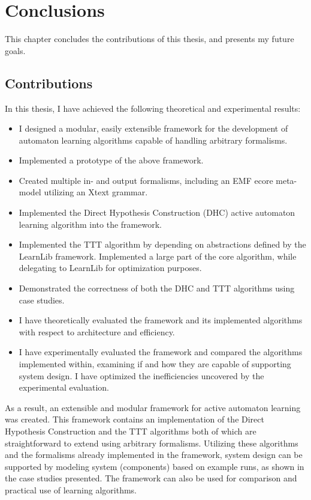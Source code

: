 \chapter{Conclusions}
This chapter concludes the contributions of this thesis, and presents my future goals.

\section{Contributions}
In this thesis, I have achieved the following theoretical and experimental results:
\begin{itemize}
	\item I designed a modular, easily extensible framework for the development of automaton learning algorithms capable of handling arbitrary formalisms.
	\item Implemented a prototype of the above framework.
	\item Created multiple in- and output formalisms, including an EMF ecore meta-model utilizing an Xtext grammar.
	\item Implemented the Direct Hypothesis Construction (DHC) active automaton learning algorithm into the framework.
	\item Implemented the TTT algorithm by depending on abstractions defined by the LearnLib\cite{10.1007/978-3-319-21690-4_32} framework. Implemented a large part of the core algorithm, while delegating to LearnLib for optimization purposes.
	\item Demonstrated the correctness of both the DHC and TTT algorithms using case studies.
	\item I have theoretically evaluated the framework and its implemented algorithms with respect to architecture and efficiency.
	\item I have experimentally evaluated the framework and compared the algorithms implemented within, examining if and how they are capable of supporting system design. I have optimized the inefficiencies uncovered by the experimental evaluation.
\end{itemize}

As a result, an extensible and modular framework for active automaton learning was created. This framework contains an implementation of the Direct Hypothesis Construction and the TTT algorithms both of which are straightforward to extend using arbitrary formalisms. Utilizing these algorithms and the formalisms already implemented in the framework, system design can be supported by modeling system (components) based on example runs, as shown in the case studies presented. The framework can also be used for comparison and practical use of learning algorithms.

